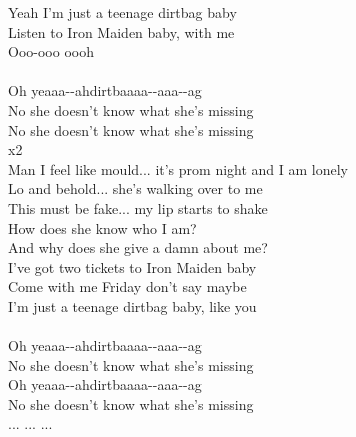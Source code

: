 Yeah I’m just a teenage dirtbag baby \\
Listen to Iron Maiden baby, with me\\
Ooo-ooo oooh\\
  \\
Oh yeaaa--ahdirtbaaaa--aaa--ag\\
No she doesn’t know what she’s missing\\
No she doesn’t know what she’s missing\\
   x2\\
Man I feel like mould... it’s prom night and I am lonely\\
Lo and behold... she’s walking over to me\\
This must be fake... my lip starts to shake\\
How does she know who I am? \\
And why does she give a damn about me?\\
I’ve got two tickets to Iron Maiden baby \\
Come with me Friday don’t say maybe \\
I’m just a teenage dirtbag baby, like you\\
  \\
Oh yeaaa--ahdirtbaaaa--aaa--ag\\
No she doesn’t know what she’s missing\\
Oh yeaaa--ahdirtbaaaa--aaa--ag\\
No she doesn’t know what she’s missing\\
 ...  ...  ... \\
  \\

